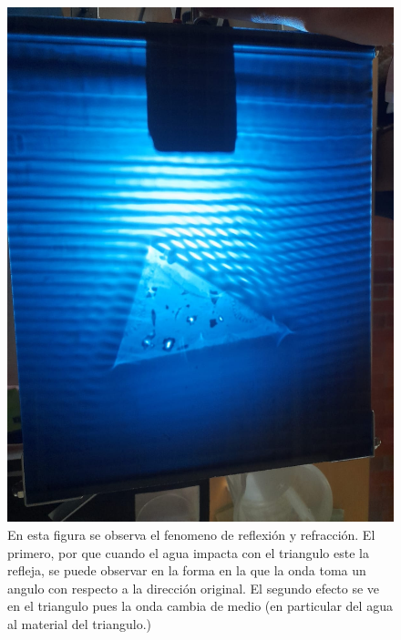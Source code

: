\documentclass[a4paper, amsfonts, amssymb, amsmath, reprint, showkeys, nofootinbib, twoside]{revtex4-1}
\begin{document}
        \begin{figure}[h]
          \centering
          \includegraphics[scale=0.1]{Triangulo_Reflexion.jpeg}
          \caption{En esta figura se observa el fenomeno de reflexión y refracción. El primero, por que cuando el agua impacta con el triangulo este la refleja, se puede observar en la forma en la que la onda toma un angulo con respecto a la dirección original. El segundo efecto se ve en el triangulo pues la onda cambia de medio (en particular del agua al material del triangulo.)}\label{fig:Triangulo}
        \end{figure}
\end{document}
